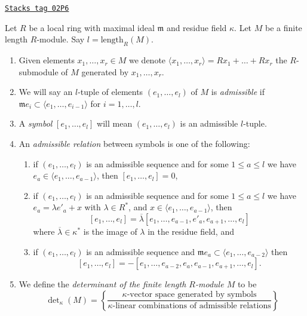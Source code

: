 \begin{definition}[Determinant]
\label{chow-definition-determinant}
\href{https://stacks.math.columbia.edu/tag/02P6}{\texttt{Stacks tag 02P6}}

Let $R$ be a local ring with maximal ideal $\mathfrak m$ and
residue field $\kappa$. Let $M$ be a finite length $R$-module.
Say $l = \text{length}_R(M)$.
\begin{enumerate}
\item Given elements $x_1, \ldots, x_r \in M$ we denote
$\langle x_1, \ldots, x_r \rangle = Rx_1 + \ldots + Rx_r$ the
$R$-submodule of $M$ generated by $x_1, \ldots, x_r$.
\item We will say an $l$-tuple of elements
$(e_1, \ldots, e_l)$ of $M$ is {\it admissible} if
$\mathfrak m e_i \subset \langle e_1, \ldots, e_{i - 1} \rangle$
for $i = 1, \ldots, l$.
\item A {\it symbol} $[e_1, \ldots, e_l]$ will mean
$(e_1, \ldots, e_l)$ is an admissible $l$-tuple.
\item An {\it admissible relation} between symbols is one of the following:
\begin{enumerate}
\item if $(e_1, \ldots, e_l)$ is an admissible sequence and
for some $1 \leq a \leq l$ we have
$e_a \in \langle e_1, \ldots, e_{a - 1}\rangle$, then
$[e_1, \ldots, e_l] = 0$,
\item if $(e_1, \ldots, e_l)$ is an admissible sequence and
for some $1 \leq a \leq l$ we have $e_a = \lambda e'_a + x$
with $\lambda \in R^*$, and
$x \in \langle e_1, \ldots, e_{a - 1}\rangle$, then
$$
[e_1, \ldots, e_l] =
\overline{\lambda} [e_1, \ldots, e_{a - 1}, e'_a, e_{a + 1}, \ldots, e_l]
$$
where $\overline{\lambda} \in \kappa^*$ is the image of $\lambda$ in
the residue field, and
\item if $(e_1, \ldots, e_l)$ is an admissible sequence and
$\mathfrak m e_a \subset \langle e_1, \ldots, e_{a - 2}\rangle$ then
$$
[e_1, \ldots, e_l] =
- [e_1, \ldots, e_{a - 2}, e_a, e_{a - 1}, e_{a + 1}, \ldots, e_l].
$$
\end{enumerate}
\item
We define the {\it determinant of the finite length $R$-module $M$} to be
$$
\det\nolimits_\kappa(M) =
\left\{
\frac{\kappa\text{-vector space generated by symbols}}
{\kappa\text{-linear combinations of admissible relations}}
\right\}
$$
\end{enumerate}
\end{definition}

